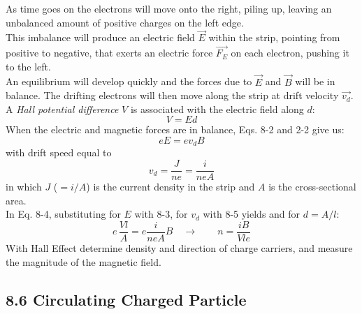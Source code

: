 \documentclass[12pt, a4paper]{article}
\begin{document}
		As time goes on the electrons will move onto the right, piling up, leaving an unbalanced amount of positive charges on the left edge. \\ This imbalance will produce an electric field $\vec{E}$ within the strip, pointing from positive to negative, that exerts an electric force $\vec{F_E}$ on each electron, pushing it to the left. \\ 
		An equilibrium will develop quickly and the forces due to $\vec{E}$ and $\vec{B}$ will be in balance. The drifting electrons will then move along the strip at drift velocity $\vec{v_d}$. \\ 
		A \textit{Hall potential difference} $V$ is associated with the electric field along $d$:
		\[
			V = Ed
			\tag{8-3}
		\]
		When the electric and magnetic forces are in balance, Eqs. 8-2 and 2-2 give us:
		\[
			e E = e v_d B
			\tag{8-4}
		\]
		with drift speed equal to
		\[
			v_d = \frac{J}{ne} = \frac{i}{n e A}
			\tag{8-5}
		\]
		in which $J$ ($= i/A$) is the current density in the strip and $A$ is the cross-sectional area. \\
		In Eq. 8-4, substituting for $E$ with 8-3, for $v_d$ with 8-5 yields and for $d = A / l$:
		\[
			e \, \frac{Vl}{A} = e \frac{i}{neA} B \quad \rightarrow \quad \quad
			n = \frac{iB}{Vle}
			\tag{8-6}
		\]
		With Hall Effect determine density and direction of charge carriers, and measure the magnitude of the magnetic field.
		
		
		
		\subsection*{8.6 Circulating Charged Particle}
		
\end{document}
